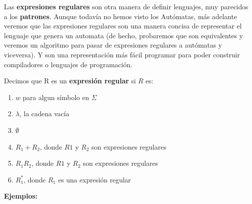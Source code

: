 Las \textbf{expresiones regulares} son otra manera de definir lenguajes, muy parecidos a los \textbf{patrones}. Aunque todavía 
no hemos visto los Autómatas, más adelante veremos que las expresiones regulares son una manera concisa
de representar el lenguaje que genera un automata (de hecho, probaremos que son equivalentes y veremos un 
algoritmo para pasar de expresiones regulares a autómatas y viceversa). Y son una representación más fácil programar para poder 
construir compiladores o lenguajes de programación.  

\begin{Def}
    Decimos que R es un \textbf{expresión regular} si $R$ es:
    \begin{enumerate}
        \item $w$ para algun símbolo en $\Sigma$
        \item $\lambda$, la cadena vacía
        \item $\emptyset$
        \item $R_1 + R_2$, donde $R1$ y $R_2$ son expresiones regulares
        \item $R_1R_2$, donde $R1$ y $R_2$ son expresiones regulares
        \item $R_1^*$, donde $R_1$ es una expresión regular
    \end{enumerate}
\end{Def}

\textbf{Ejemplos:}

